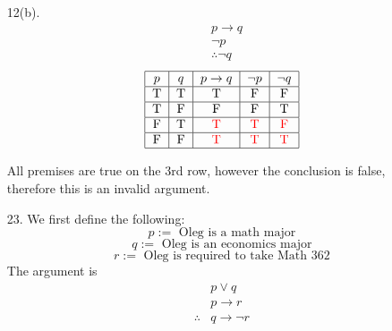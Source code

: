 \documentclass[12pt]{article}
\newcommand{\redt}{\textcolor{red}{T}}
\newcommand{\redf}{\textcolor{red}{F}}
\begin{document}
\begin{enumerate}
\begin{enumerate}
                \item[12(b).]
                    \begin{align*}
                        & p \rightarrow q\\
                        & \neg p\\
                        & \therefore \neg q
                    \end{align*}
                    \[
                    \begin{tabular}{|c|c|c|c|c|}
                        \hline
                        $p$ & $q$ & $p \rightarrow q$ & $\neg p$ & $\neg q$ \\
                        \hline
                        T & T & T & F & F \\
                        \hline
                        T & F & F & F & T \\
                        \hline
                        F & T & \redt & \redt & \redf \\
                        \hline
                        F & F & \redt & \redt & \redt \\
                        \hline
                    \end{tabular}
                    \]

                All premises are true on the 3rd row, however the conclusion is false, therefore this is an invalid argument. 

                \item[23.] We first define the following:
                \[
                p:= \text{ Oleg is a math major}
                \]
                \[
                q:= \text{ Oleg is an economics major}
                \]
                \[
                r:= \text{ Oleg is required to take Math 362}
                \]
                The argument is
                \begin{align*}
                    & p \vee q\\
                    & p \rightarrow r\\
                    \therefore & q \rightarrow \neg r
                \end{align*}


\end{enumerate}
\end{enumerate}
\end{document}
